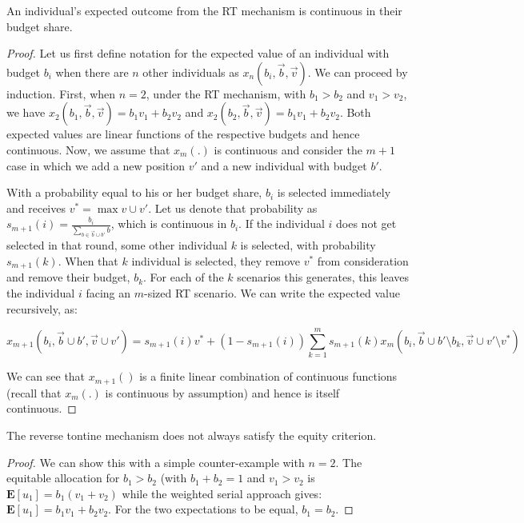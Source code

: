 \documentclass[prodmode,acmec]{acmsmall}
\begin{document}
\begin{proposition}
An individual's expected outcome from the RT mechanism is continuous
in their budget share.
\end{proposition}
\begin{proof} 
  
  Let us first define notation for the expected value of an individual
  with budget $b_i$ when there are $n$ other individuals as $x_n(b_i,
  \vec{b}, \vec{v})$. We can proceed by induction. First, when $n=2$,
  under the RT mechanism, with $b_1 > b_2$ and $v_1 > v_2$, we have
  $x_2(b_1, \vec{b}, \vec{v}) = b_1v_1 + b_2v_2$ and $x_2(b_2,
  \vec{b}, \vec{v}) = b_1v_1 + b_2v_2$. Both expected values are
  linear functions of the respective budgets and hence
  continuous. Now, we assume that $x_m(.)$ is continuous and consider
  the $m+1$ case in which we add a new position $v'$ and a new
  individual with budget $b'$.

With a probability equal to his or her budget share, $b_i$ is selected
immediately and receives $v^* = \max v \cup v'$. Let us denote that
probability as $s_{m+1}(i) = \frac{b_i}{\sum_{b \in \vec{b} \cup b'}
  b}$, which is continuous in $b_i$. If the individual $i$ does not
get selected in that round, some other individual $k$ is selected,
with probability $s_{m+1}(k)$. When that $k$ individual is selected,
they remove $v^*$ from consideration and remove their budget,
$b_k$. For each of the $k$ scenarios this generates, this leaves the
individual $i$ facing an $m$-sized RT scenario. We can write the
expected value recursively, as:


\begin{equation*} 
x_{m+1}(b_i, \vec{b} \cup b', \vec{v} \cup v') = 
s_{m+1}(i) v^* + 
\left(1- s_{m+1}(i) \right) 
\sum_{k=1}^{m} s_{m+1}(k) x_m (b_i, \vec{b} \cup b' \setminus b_k, \vec{v} \cup v' \setminus v^*) 
\end{equation*}


We can see that $x_{m+1}()$ is a finite linear combination of
continuous functions (recall that $x_{m}(.)$ is continuous by
assumption) and hence is itself continuous.
\end{proof} 

\begin{proposition} 
  The reverse tontine mechanism does not always satisfy the equity
  criterion.
\end{proposition} 
\begin{proof}
We can show this with a simple counter-example with $n=2$. The
equitable allocation for $b_1 > b_2$ (with $b_1 + b_2 = 1$ and $v_1 >
v_2$ is $\mathbf{E}[u_1] = b_1 \left(v_1 + v_2\right)$ while the
weighted serial approach gives: $\mathbf{E}[u_1] = b_1 v_1 + b_2
v_2$. For the two expectations to be equal, $b_1 = b_2$.
\end{proof} 
\end{document}
